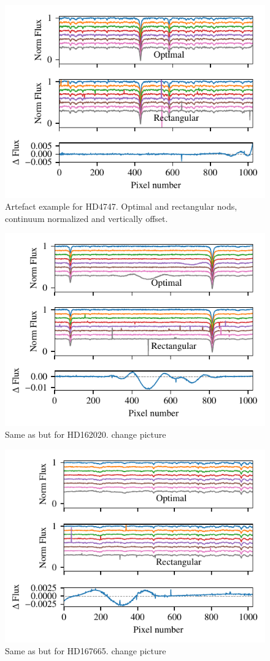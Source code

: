  \begin{figure}
     \centering
     \includegraphics[width=0.7\linewidth]{figures/reduction/bp_plots/extraction_comparision_HD4747-1_chip_1}
     \caption{Artefact example for HD4747. Optimal and rectangular nods, continuum normalized and vertically offset.}
     \label{fig:artefact_example1}
 \end{figure}
 \begin{figure}
     \centering
     \includegraphics[width=0.7\linewidth]{figures/reduction/bp_plots/extraction_comparision_HD4747-1_chip_2}
     \caption{Same as  but for HD162020. {\red{} change picture}}
     \label{fig:artefact_example2}
 \end{figure}
 \begin{figure}
     \centering
     \includegraphics[width=0.7\linewidth]{figures/reduction/bp_plots/extraction_comparision_HD4747-1_chip_3}
     \caption{Same as  but for HD167665. {\red{} change picture}}
     \label{fig:artefact_example3}
 \end{figure}

